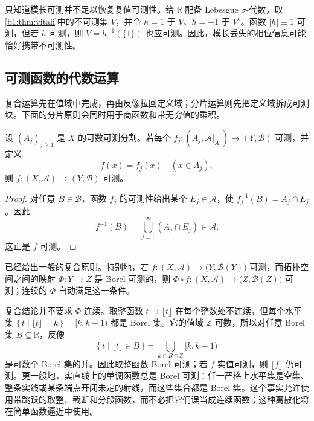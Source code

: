 只知道模长可测并不足以恢复复值可测性。给 \(\mathbb R\) 配备 Lebesgue \(\sigma\)-代数，取\cref{b1:thm:vitali}中的不可测集 \(V\)，并令 \(h=1\) 于 \(V\)、\(h=-1\) 于 \(V^{\mathrm c}\)。函数 \(|h|\equiv1\) 可测，但若 \(h\) 可测，则
\(V=h^{-1}(\{1\})\) 也应可测。因此，模长丢失的相位信息可能恰好携带不可测性。

\subsection{可测函数的代数运算}
\label{b1:subsec:040104}

复合运算先在值域中完成，再由反像拉回定义域；分片运算则先把定义域拆成可测块。下面的分片原则会同时用于商函数和带无穷值的乘积。

\begin{lemma}
\label{b1:lem:measurable-pasting}
设 \((A_j)_{j\geq1}\) 是 \(X\) 的可数可测分割。若每个
\(f_j:(A_j,\mathcal A|_{A_j})\rightarrow(Y,\mathcal B)\) 可测，并定义
\[
f(x)=f_j(x)\quad(x\in A_j),
\]
则 \(f:(X,\mathcal A)\rightarrow(Y,\mathcal B)\) 可测。
\end{lemma}
\begin{proof}
对任意 \(B\in\mathcal B\)，函数 \(f_j\) 的可测性给出某个 \(E_j\in\mathcal A\)，使
\(f_j^{-1}(B)=A_j\cap E_j\)。因此
\[
f^{-1}(B)
=\bigcup_{j=1}^{\infty}(A_j\cap E_j)
\in\mathcal A.
\]
这正是 \(f\) 可测。
\end{proof}

已经给出一般的复合原则。特别地，若
\(f:(X,\mathcal A)\rightarrow\bigl(Y,\mathcal B(Y)\bigr)\) 可测，而拓扑空间之间的映射
\(\Phi:Y\rightarrow Z\) 是 Borel 可测的，则
\(\Phi\circ f:(X,\mathcal A)\rightarrow\bigl(Z,\mathcal B(Z)\bigr)\) 可测；连续的
\(\Phi\) 自动满足这一条件。

\ProseParagraphBreak

复合结论并不要求 \(\Phi\) 连续。取整函数
\(t\mapsto\lfloor t\rfloor\) 在每个整数处不连续，但每个水平集
\(\{\,t\mid\lfloor t\rfloor=k\,\}=[k,k+1)\) 都是 Borel 集。它的值域 \(\mathbb Z\) 可数，所以对任意 Borel 集 \(B\subseteq\mathbb R\)，反像
\[
\{\,t\mid\lfloor t\rfloor\in B\,\}
=\bigcup_{k\in B\cap\mathbb Z}[k,k+1)
\]
是可数个 Borel 集的并。因此取整函数 Borel 可测；若 \(f\) 实值可测，则 \(\lfloor f\rfloor\) 仍可测。更一般地，实直线上的单调函数总是 Borel 可测：任一严格上水平集是空集、整条实线或某条端点开闭未定的射线，而这些集合都是 Borel 集。这个事实允许使用带跳跃的取整、截断和分段函数，而不必把它们误当成连续函数；这种离散化将在简单函数逼近中使用。

